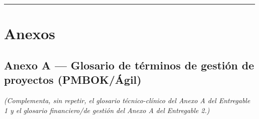 \documentclass[11pt,a4paper]{article}
\begin{document}
\begin{center}\rule{0.5\linewidth}{0.5pt}\end{center}

\section{Anexos}\label{anexos}

\subsection{Anexo A --- Glosario de términos de gestión de proyectos (PMBOK/Ágil)}\label{anexo-a-glosario-de-tuxe9rminos-de-gestiuxf3n-de-proyectos-pmbokuxe1gil}

\emph{(Complementa, sin repetir, el glosario técnico-clínico del Anexo A del Entregable 1 y el glosario financiero/de gestión del Anexo A del Entregable 2.)}
\end{document}
